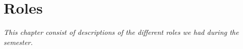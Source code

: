 \chapter{Roles} \label{ChapRoles}
\textit{This chapter consist of descriptions of the different roles we had during the semester.}



